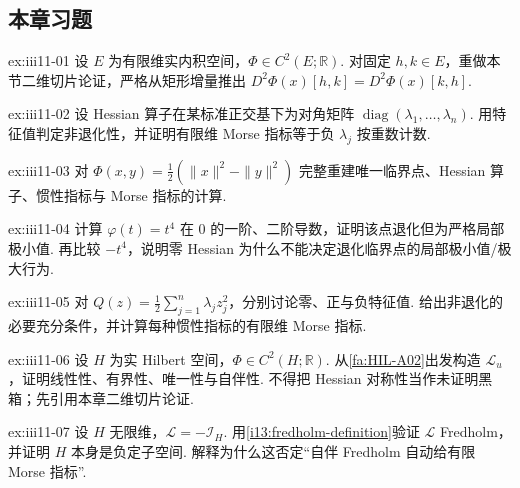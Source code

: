 \subsection*{本章习题}\label{sec:iii11-exercises}

\begin{FAExercise}{ex:iii11-01}
设 \(\displaystyle E\) 为有限维实内积空间，\(\displaystyle\Phi\in C^2(E;\mathbb R)\). 对固定 \(\displaystyle h,k\in E\)，重做本节二维切片论证，严格从矩形增量推出 \(\displaystyle D^2\Phi(x)[h,k]=D^2\Phi(x)[k,h]\).
\end{FAExercise}

\begin{FAExercise}{ex:iii11-02}
设 Hessian 算子在某标准正交基下为对角矩阵 \(\displaystyle\operatorname{diag}(\lambda_1,\dots,\lambda_n)\). 用特征值判定非退化性，并证明有限维 Morse 指标等于负 \(\displaystyle\lambda_j\) 按重数计数.
\end{FAExercise}

\begin{FAExercise}{ex:iii11-03}
对 \(\displaystyle\Phi(x,y)=\frac{1}{2}(\|x\|^2-\|y\|^2)\) 完整重建唯一临界点、Hessian 算子、惯性指标与 Morse 指标的计算.
\end{FAExercise}

\begin{FAExercise}[退化 \(\displaystyle t^4\)]{ex:iii11-04}
计算 \(\displaystyle\varphi(t)=t^4\) 在 \(\displaystyle0\) 的一阶、二阶导数，证明该点退化但为严格局部极小值. 再比较 \(\displaystyle-t^4\)，说明零 Hessian 为什么不能决定退化临界点的局部极小值/极大行为.
\end{FAExercise}

\begin{FAExercise}[二次型惯性指标]{ex:iii11-05}
对 \(\displaystyle Q(z)=\frac{1}{2}\sum_{j=1}^n\lambda_jz_j^2\)，分别讨论零、正与负特征值. 给出非退化的必要充分条件，并计算每种惯性指标的有限维 Morse 指标.
\end{FAExercise}

\begin{FAExercise}{ex:iii11-06}
设 \(\displaystyle H\) 为实 Hilbert 空间，\(\displaystyle\Phi\in C^2(H;\mathbb R)\). 从\autoref{fa:HIL-A02}出发构造 \(\displaystyle\mathcal L_u\)，证明线性性、有界性、唯一性与自伴性. 不得把 Hessian 对称性当作未证明黑箱；先引用本章二维切片论证.
\end{FAExercise}

\begin{FAExercise}{ex:iii11-07}
设 \(\displaystyle H\) 无限维，\(\displaystyle\mathcal L=-\mathcal I_H\). 用\autoref{i13:fredholm-definition}验证 \(\displaystyle\mathcal L\) Fredholm，并证明 \(\displaystyle H\) 本身是负定子空间. 解释为什么这否定“自伴 Fredholm 自动给有限 Morse 指标”.
\end{FAExercise}

